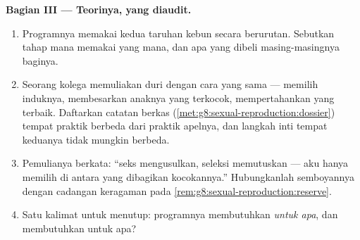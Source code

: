 \begin{problem}
\medskip\noindent\textbf{Bagian III --- Teorinya, yang
diaudit.}
\begin{enumerate}[resume]
  \item Programnya memakai kedua taruhan kebun  secara
        berurutan. Sebutkan tahap mana memakai yang mana, dan apa yang
        dibeli masing-masingnya baginya.
  \item Seorang kolega memuliakan  duri dengan cara yang sama ---
        memilih induknya, membesarkan anaknya yang terkocok,
        mempertahankan yang terbaik. Daftarkan catatan berkas
        (\cref{met:g8:sexual-reproduction:dossier}) tempat praktik
         berbeda dari praktik apelnya, dan langkah inti tempat
        keduanya tidak mungkin berbeda.
  \item Pemulianya berkata: ``seks mengusulkan, seleksi memutuskan ---
        aku hanya memilih di antara yang dibagikan kocokannya.''
        Hubungkanlah semboyannya dengan cadangan keragaman pada
        \cref{rem:g8:sexual-reproduction:reserve}.
  \item Satu kalimat untuk menutup: programnya membutuhkan  \emph{untuk apa}, dan membutuhkan  untuk apa?
\end{enumerate}
\end{problem}
